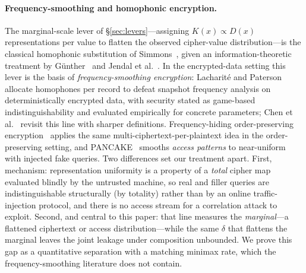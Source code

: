 \documentclass[conference]{IEEEtran}
\theoremstyle{definition}
\theoremstyle{plain}
\theoremstyle{remark}
\begin{document}
\paragraph{Frequency-smoothing and homophonic encryption.}
The marginal-scale lever of \S\ref{sec:levers}---assigning $K(x) \propto
D(x)$ representations per value to flatten the observed cipher-value
distribution---is the classical homophonic substitution of
Simmons~\cite{simmons1979symmetric}, given an information-theoretic
treatment by G{\"u}nther~\cite{gunther1988universal} and Jendal et
al.~\cite{jendal1989information}.  In the encrypted-data setting this
lever is the basis of \emph{frequency-smoothing encryption}: Lacharit{\'e}
and Paterson~\cite{lacharite2018frequency} allocate homophones per record
to defeat snapshot frequency analysis on deterministically encrypted data,
with security stated as game-based indistinguishability and evaluated
empirically for concrete parameters; Chen et
al.~\cite{chen2024revisiting} revisit this line with sharper definitions.
Frequency-hiding order-preserving encryption~\cite{kerschbaum2015frequency}
applies the same multi-ciphertext-per-plaintext idea in the order-preserving
setting, and PANCAKE~\cite{grubbs2020pancake} smooths \emph{access patterns}
to near-uniform with injected fake queries.  Two differences set our
treatment apart.  First, mechanism: representation uniformity is a property
of a \emph{total} cipher map evaluated blindly by the untrusted machine, so
real and filler queries are indistinguishable structurally (by totality)
rather than by an online traffic-injection protocol, and there is no access
stream for a correlation attack to exploit.  Second, and central to this
paper: that line measures the \emph{marginal}---a flattened ciphertext or
access distribution---while the same $\delta$ that flattens the marginal
leaves the joint leakage under composition unbounded.  We prove this gap
as a quantitative separation with a matching minimax rate, which the
frequency-smoothing literature does not contain.
\end{document}
